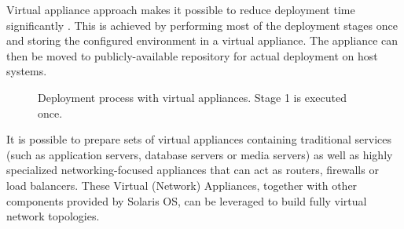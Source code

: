 \documentclass[11pt]{book}
\begin{document}

        Virtual appliance approach makes it possible to reduce deployment time significantly \cite{changhua}. This is
        achieved by performing most of the deployment stages once and storing the configured environment in a virtual
        appliance. The appliance can then be moved to publicly-available repository for actual deployment on host
        systems.

        \begin{figure}[H]
          \begin{center}
          \end{center}

          \caption{Deployment process with virtual appliances. Stage 1 is executed once.}
        \end{figure}

        It is possible to prepare sets of virtual appliances containing traditional services (such as application
        servers, database servers or media servers) as well as highly specialized networking-focused appliances that can
        act as routers, firewalls or load balancers. These Virtual (Network) Appliances, together with other components
        provided by Solaris OS, can be leveraged to build fully virtual network topologies.
\end{document}
